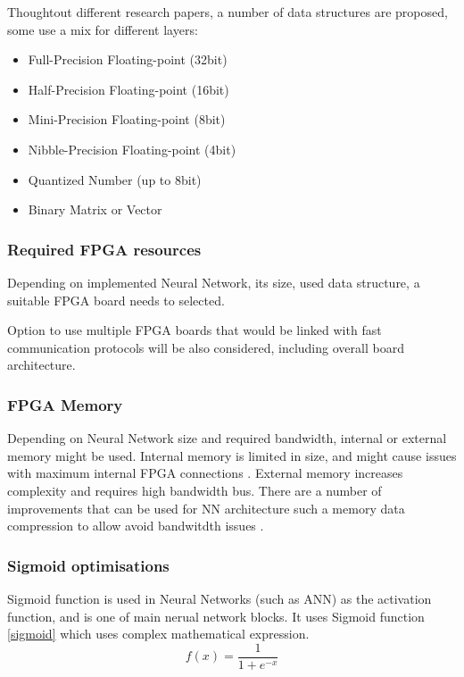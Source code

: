 Thoughtout different research papers, a number of data structures are proposed, some use a mix for different layers:
\begin{itemize}
	\item Full-Precision Floating-point (32bit)
	\item Half-Precision Floating-point (16bit) \autocite{6927383,8108073}
	\item Mini-Precision Floating-point (8bit) \autocite{6927383}
	\item Nibble-Precision Floating-point (4bit) \autocite{6927383}
	\item Quantized Number (up to 8bit) \autocite{8702332,8280163,8330546}
	\item Binary Matrix or Vector \autocite{9039366,8280163,7929192}
\end{itemize}

\subsubsection{Required FPGA resources}
 Depending on implemented Neural Network, its size, used data structure, a suitable FPGA board needs to selected. 
 
 Option to use multiple FPGA boards that would be linked with fast communication protocols will be also considered, including overall board architecture.

\subsubsection{FPGA Memory}
Depending on Neural Network size and required bandwidth, internal or external memory might be used. Internal memory is limited in size, and might cause issues with maximum internal FPGA connections \autocite{7929192}.
External memory increases complexity and requires high bandwidth bus. There are a number of improvements that can be used for NN architecture such a memory data compression to allow avoid bandwitdth issues \autocite{9012821}.

\subsubsection{Sigmoid optimisations}
Sigmoid function is used in Neural Networks (such as ANN) as the activation function, and is one of main nerual network blocks. It uses Sigmoid function \autoref{sigmoid} which uses complex mathematical expression.
\begin{equation}\label{sigmoid}
    f(x) = \frac{1}{1+e^{-x}}
\end{equation}

